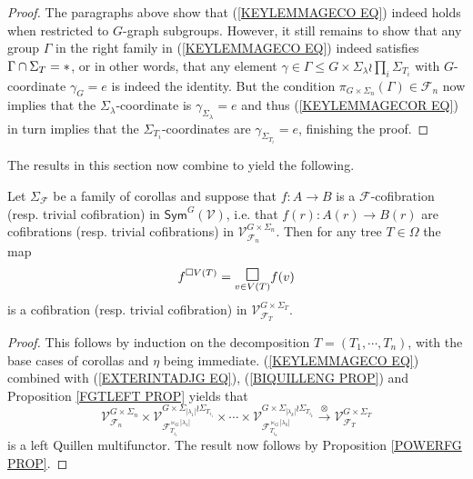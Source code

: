 \documentclass[a4paper,10pt]{article}%
\begin{document}
\begin{proof}
  The paragraphs above show that 
  (\ref{KEYLEMMAGECO EQ})
  indeed holds when restricted to $G$-graph subgroups. However, it still remains to show that any group $\Gamma$ in the right family in (\ref{KEYLEMMAGECO EQ}) indeed satisfies
  $\Gamma \cap \Sigma_T =\**$, or in other words, that any element $\gamma \in \Gamma \leq G \times \Sigma_{\lambda} \wr \prod_{i} \Sigma_{T_i}$ with $G$-coordinate 
  $\gamma_G = e$ is indeed the identity.
  But the condition 
  $\pi_{G \times \Sigma_n}(\Gamma) \in \mathcal{F}_n$ now implies that the $\Sigma_{\lambda}$-coordinate is $\gamma_{\Sigma_{\lambda}} = e$
  and thus (\ref{KEYLEMMAGECOR EQ}) in turn implies that the 
  $\Sigma_{T_i}$-coordinates are 
  $\gamma_{\Sigma_{T_i}} = e$,
  finishing the proof.
\end{proof}


The results in this section now combine to yield the following.


\begin{proposition}\label{AUTTCOFPUSH PROP}
  Let $\Sigma_{\mathcal{F}}$ be a family of corollas 
  and suppose that 
  $f \colon A \to B$ is a $\mathcal{F}$-cofibration (resp. trivial cofibration)
  in $\mathsf{Sym}^G(\mathcal{V})$, i.e. that 
  $f(r) \colon A(r) \to B(r)$ are cofibrations (resp. trivial cofibrations) in 
  $\mathcal{V}^{G \times \Sigma_n}_{\mathcal{F}_n}$. Then for any tree $T \in \Omega$ the map
  \[
  f^{\square V(T)} = 
  \underset{v \in V(T)}{\mathlarger{\mathlarger{\square}}}
  f(v)\]
  is a cofibration (resp. trivial cofibration) in 
  $\mathcal{V}^{G \times \Sigma_T}_{\mathcal{F}_T}$.
\end{proposition}


\begin{proof}
  This follows by induction on the decomposition 
  $T=(T_1,\cdots,T_n)$, with the base cases of corollas and $\eta$ being immediate. (\ref{KEYLEMMAGECO EQ}) combined with (\ref{EXTERINTADJG EQ}), (\ref{BIQUILLENG PROP}) and Proposition \ref{FGTLEFT PROP} yields that
  \[
  \mathcal{V}^{G \times \Sigma_n}_{\mathcal{F}_n}	
  \times
  \mathcal{V}
  ^{G \times \Sigma_{|\lambda_1|}\wr \Sigma_{T_{i_1}}}
  _{\mathcal{F}_{T_{i_1}}^{\ltimes_G |\lambda_1|}}
  \times \cdots \times
  \mathcal{V}
  ^{G \times \Sigma_{|\lambda_k|}\wr \Sigma_{T_{i_k}}}
  _{\mathcal{F}_{T_{i_k}}^{\ltimes_G |\lambda_k|}}
  \xrightarrow{\otimes}
  \mathcal{V}^{G \times \Sigma_T}_{\mathcal{F}_T}
  \]
  is a left Quillen multifunctor.
  The result now follows by Proposition \ref{POWERFG PROP}. 
\end{proof}
\end{document}
